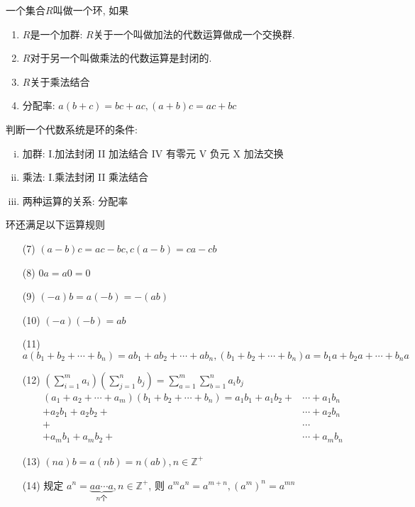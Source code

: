 \begin{Definition}[环]
一个集合$R$叫做一个环, 如果
\begin{enumerate}
	\item $R$是一个加群: $R$关于一个叫做加法的代数运算做成一个交换群.
	\item $R$对于另一个叫做乘法的代数运算是封闭的.
	\item $R$关于乘法结合
	\item 分配率: $a(b+c) = bc + ac, (a+b)c = ac + bc$
\end{enumerate}
\end{Definition}

\begin{Note}[环的判别] 判断一个代数系统是环的条件: 
\begin{enumerate}[(i)]
\item 加群: I.加法封闭 II 加法结合 IV 有零元 V 负元 X 加法交换
\item 乘法: I.乘法封闭 II 乘法结合
\item 两种运算的关系: 分配率
\end{enumerate}
\end{Note}

\begin{Theorem}
环还满足以下运算规则
\begin{enumerate}[(1)]
\item[(7)] $(a-b)c = ac - bc, c(a - b) = ca - cb$
\item[(8)] $\mathfrak{0}a = a\mathfrak{0} = \mathfrak{0}$
\item[(9)] $(-a)b = a(-b) = -(ab)$
\item[(10)] $(-a)(-b) = ab$
\item[(11)] $a(b_1 + b_2 + \cdots + b_n) = ab_1 +ab_2 + \cdots + ab_n, (b_1 + b_2 + \cdots + b_n)a = b_1a + b_2a + \cdots + b_na$
\item[(12)] 
$ \displaystyle \left( \sum_{i=1}^m a_i \right) \left( \sum_{j=1}^n b_j \right) 
= \sum_{a=1}^m \sum_{b=1}^{n} a_i b_j $
           $$
\begin{aligned}
(a_1 + a_2 + \cdots + a_m) (b_1 + b_2 + \cdots + b_n) 
= 
a_1b_1 + a_1 b_2 + &\cdots + a_1 b_n \\
+ a_2 b_1 + a_2 b_2 + &\cdots + a_2 b_n \\
+ &\cdots \\
+ a_m b_1 + a_m b_2 + &\cdots + a_m b_n
\end{aligned}
 $$
 \item[(13)] $ (na)b = a(nb) = n(ab), n \in \mathbb{Z}^+$ 
 \item[(14)] 规定 $a^n = \underbrace{a a \cdots a}_{n\text{个}}, n \in \mathbb{Z}^{+}$, 则 $ a^m a^n = a^{m+n}, (a^m)^n = a^{mn} $
\end{enumerate}
\end{Theorem}

